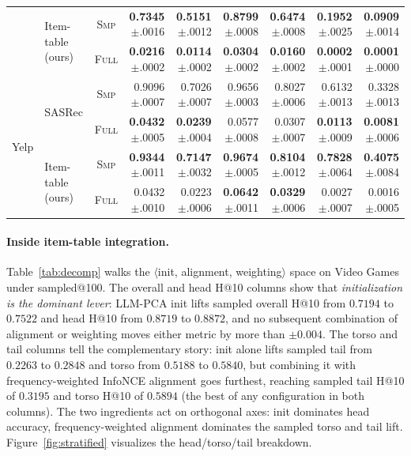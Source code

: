 \documentclass{article}
\begin{document}
\begin{table}[!htbp]
{\begin{tabular}{llcrrrrrr}
                              & \multirow{2}{*}{Item-table (ours)}  & \textsc{Smp}  & \textbf{0.7345}{\tiny$\pm$.0016} & \textbf{0.5151}{\tiny$\pm$.0012} & \textbf{0.8799}{\tiny$\pm$.0008} & \textbf{0.6474}{\tiny$\pm$.0008} & \textbf{0.1952}{\tiny$\pm$.0025} & \textbf{0.0909}{\tiny$\pm$.0014} \\
                              &                                     & \textsc{Full} & \textbf{0.0216}{\tiny$\pm$.0002} & \textbf{0.0114}{\tiny$\pm$.0002} & \textbf{0.0304}{\tiny$\pm$.0002} & \textbf{0.0160}{\tiny$\pm$.0002} & \textbf{0.0002}{\tiny$\pm$.0001} & \textbf{0.0001}{\tiny$\pm$.0000} \\
    \midrule
    \multirow{4}{*}{Yelp}    & \multirow{2}{*}{SASRec}             & \textsc{Smp}  & 0.9096{\tiny$\pm$.0007} & 0.7026{\tiny$\pm$.0007} & 0.9656{\tiny$\pm$.0003} & 0.8027{\tiny$\pm$.0006} & 0.6132{\tiny$\pm$.0013} & 0.3328{\tiny$\pm$.0013} \\
                              &                                     & \textsc{Full} & \textbf{0.0432}{\tiny$\pm$.0005} & \textbf{0.0239}{\tiny$\pm$.0004} & 0.0577{\tiny$\pm$.0008} & 0.0307{\tiny$\pm$.0007} & \textbf{0.0113}{\tiny$\pm$.0009} & \textbf{0.0081}{\tiny$\pm$.0006} \\
                              & \multirow{2}{*}{Item-table (ours)}  & \textsc{Smp}  & \textbf{0.9344}{\tiny$\pm$.0011} & \textbf{0.7147}{\tiny$\pm$.0032} & \textbf{0.9674}{\tiny$\pm$.0005} & \textbf{0.8104}{\tiny$\pm$.0012} & \textbf{0.7828}{\tiny$\pm$.0064} & \textbf{0.4075}{\tiny$\pm$.0084} \\
                              &                                     & \textsc{Full} & 0.0432{\tiny$\pm$.0010} & 0.0223{\tiny$\pm$.0006} & \textbf{0.0642}{\tiny$\pm$.0011} & \textbf{0.0329}{\tiny$\pm$.0006} & 0.0027{\tiny$\pm$.0007} & 0.0016{\tiny$\pm$.0005} \\
    \bottomrule
  \end{tabular}}%
\end{table}

\paragraph{Inside item-table integration.}
Table~\ref{tab:decomp} walks the $\langle$init, alignment,
weighting$\rangle$ space on Video Games under sampled@100.
The overall and head H@10 columns show that
\emph{initialization is the dominant lever}: LLM-PCA init lifts
sampled overall H@10 from $0.7194$ to $0.7522$ and head H@10
from $0.8719$ to $0.8872$, and no subsequent combination of
alignment or weighting moves either metric by more than
$\pm 0.004$. The torso and tail columns tell the complementary
story: init alone lifts sampled tail from $0.2263$ to $0.2848$
and torso from $0.5188$ to $0.5840$, but combining it with
frequency-weighted InfoNCE alignment goes furthest, reaching
sampled tail H@10 of $0.3195$ and torso H@10 of $0.5894$ (the
best of any configuration in both columns). The two ingredients
act on orthogonal axes: init dominates head accuracy,
frequency-weighted alignment dominates the sampled torso and tail
lift. Figure~\ref{fig:stratified} visualizes the head/torso/tail
breakdown.
\end{document}

